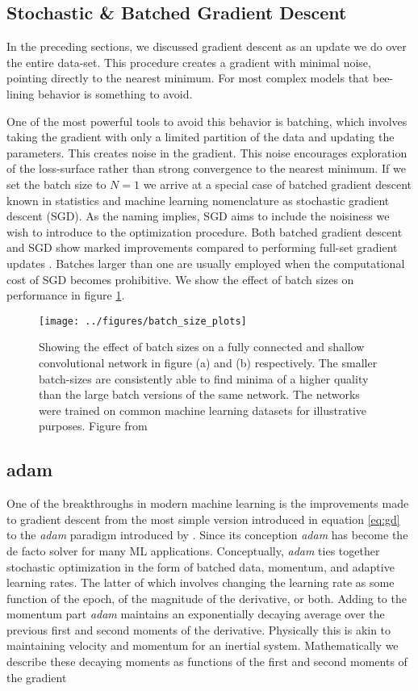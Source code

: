 \subsection{Stochastic \& Batched Gradient Descent}
In the preceding sections, we discussed gradient descent as an update we do over the entire data-set. This procedure creates a gradient with minimal noise, pointing directly to the nearest minimum. For most complex models that bee-lining behavior is something to avoid. 

One of the most powerful tools to avoid this behavior is batching, which involves taking the gradient with only a limited partition of the data and updating the parameters. This creates noise in the gradient. This noise encourages exploration of the loss-surface rather than strong convergence to the nearest minimum. If we set the batch size to $N=1$ we arrive at a special case of batched gradient descent known in statistics and machine learning nomenclature as stochastic gradient descent (SGD). As the naming implies, SGD aims to include the noisiness we wish to introduce to the optimization procedure. Both batched gradient descent and SGD show marked improvements compared to performing full-set gradient updates \cite{Keskar2016}. 
Batches larger than one are usually employed when the computational cost of SGD becomes prohibitive. We show the effect of batch sizes on performance in figure \ref{fig:batch_size}. 

\begin{figure}[ht]
\centering
\texttt{[image: ../figures/batch\_size\_plots]}
\caption[Effect of the batch size on performance]{Showing the effect of batch sizes on a fully connected and shallow convolutional network in figure (a) and (b) respectively. The smaller batch-sizes are consistently able to find minima of a higher quality than the large batch versions of the same network. The networks were trained on common machine learning datasets for illustrative purposes. Figure from \citet{Keskar2016} }\label{fig:batch_size}
\end{figure}

\subsection{adam}\label{sec:adam}
One of the breakthroughs in modern machine learning is the improvements made to gradient descent from the most simple version introduced in equation \ref{eq:gd} to the \textit{adam} paradigm introduced by \citet{Kingma2015}. Since its conception \textit{adam} has become the de facto solver for many ML applications. Conceptually, \textit{adam} ties together stochastic optimization in the form of batched data, momentum, and adaptive learning rates. The latter of which involves changing the learning rate as some function of the epoch, of the magnitude of the derivative, or both. Adding to the momentum part \textit{adam} maintains an exponentially decaying average over the previous first and second moments of the derivative. Physically this is akin to maintaining velocity and momentum for an inertial system. Mathematically we describe these decaying moments as functions of the first and second  moments of the gradient 

